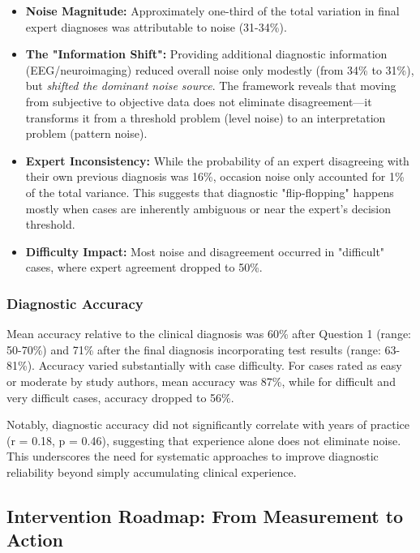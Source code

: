 \documentclass[num-refs]{wiley-article}
\begin{document}
\begin{itemize}
    \item \textbf{Noise Magnitude:} Approximately one-third of the total variation in final expert diagnoses was attributable to noise (31-34\%).

    \item \textbf{The "Information Shift":} Providing additional diagnostic information (EEG/neuroimaging) reduced overall noise only modestly (from 34\% to 31\%), but \textit{shifted the dominant noise source}. The framework reveals that moving from subjective to objective data does not eliminate disagreement---it transforms it from a threshold problem (level noise) to an interpretation problem (pattern noise).

    \item \textbf{Expert Inconsistency:} While the probability of an expert disagreeing with their own previous diagnosis was 16\%, occasion noise only accounted for 1\% of the total variance. This suggests that diagnostic "flip-flopping" happens mostly when cases are inherently ambiguous or near the expert's decision threshold.

    \item \textbf{Difficulty Impact:} Most noise and disagreement occurred in "difficult" cases, where expert agreement dropped to 50\%.
\end{itemize}

\subsubsection*{Diagnostic Accuracy}

Mean accuracy relative to the clinical diagnosis was 60\% after Question 1 (range: 50-70\%) and 71\% after the final diagnosis incorporating test results (range: 63-81\%). Accuracy varied substantially with case difficulty. For cases rated as easy or moderate by study authors, mean accuracy was 87\%, while for difficult and very difficult cases, accuracy dropped to 56\%.

Notably, diagnostic accuracy did not significantly correlate with years of practice (r = 0.18, p = 0.46), suggesting that experience alone does not eliminate noise. This underscores the need for systematic approaches to improve diagnostic reliability beyond simply accumulating clinical experience.

\subsection*{Intervention Roadmap: From Measurement to Action}
\end{document}
